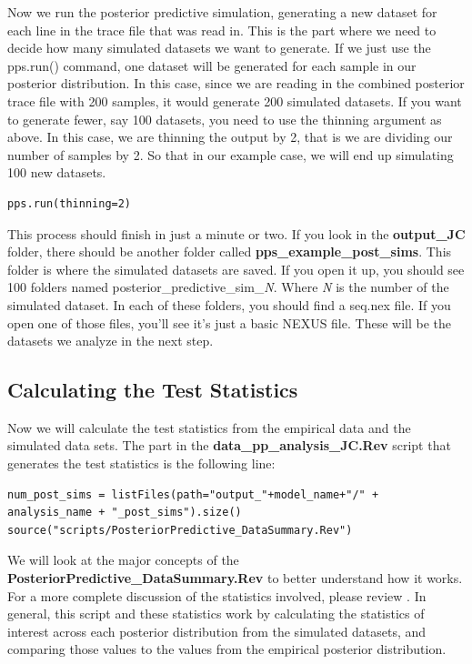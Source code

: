 Now we run the posterior predictive simulation, generating a new dataset for each line in the trace file 
that was read in. This is the part where we need to decide how many simulated datasets we want to generate.
If we just use the pps.run() command, one dataset will be generated for each sample in our posterior distribution.
In this case, since we are reading in the combined posterior trace file with 200 
samples, it would generate 200 simulated datasets. If you want to generate fewer, say 100 datasets,
you need to use the thinning argument as above. In this case, we are thinning the output by 2, that is
we are dividing our number of samples by 2. So that in our example case, we will end up simulating 100 
new datasets.
{\tt \begin{Snugshade}[184,207,236]
\begin{lstlisting}
pps.run(thinning=2)
\end{lstlisting}
\end{Snugshade}}


This process should finish in just a minute or two. If you look in the \textbf{output\_JC} folder, there should be 
another folder called \textbf{pps\_example\_post\_sims}. This folder is where the simulated datasets are saved. 
If you open it up, you should see 100 folders named posterior\_predictive\_sim\_\textit{N}. Where \textit{N} 
is the number of the simulated dataset. In each of these folders, you should find a seq.nex file. If you 
open one of those files, you'll see it's just a basic NEXUS file. These will be the datasets we analyze 
in the next step.


\subsection{Calculating the Test Statistics}

Now we will calculate the test statistics from the 
empirical data and the simulated data sets. The part in the \textbf{data\_pp\_analysis\_JC.Rev}
script that generates the test statistics is the following line:

{\tt \begin{Snugshade}[184,207,236]
\begin{lstlisting}
num_post_sims = listFiles(path="output_"+model_name+"/" + analysis_name + "_post_sims").size()
source("scripts/PosteriorPredictive_DataSummary.Rev")
\end{lstlisting}
\end{Snugshade}}


We will look at the 
major concepts of the \textbf{PosteriorPredictive\_DataSummary.Rev} to better understand how it works. For a more complete discussion of the 
statistics involved, please review \cite{Brown2014-mb, Doyle2015-qb}. In general, this script and these 
statistics work by calculating the statistics of interest across each posterior distribution from the 
simulated datasets, and comparing those values to the values from the empirical posterior distribution.

